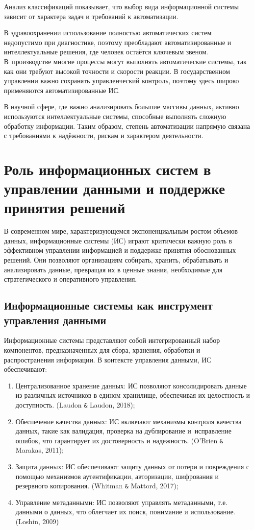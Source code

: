 \documentclass{ou}
\begin{document}
Анализ классификаций показывает, что выбор вида информационной системы зависит от характера задач и требований к автоматизации.

В здравоохранении использование полностью автоматических систем недопустимо при диагностике, поэтому преобладают автоматизированные и интеллектуальные решения, где человек остаётся ключевым звеном. В~производстве многие процессы могут выполнять автоматические системы, так как они требуют высокой точности и скорости реакции. В государственном управлении важно сохранять управленческий контроль, поэтому здесь широко применяются автоматизированные ИС.

В научной сфере, где важно анализировать большие массивы данных, активно используются интеллектуальные системы, способные выполнять сложную обработку информации. Таким образом, степень автоматизации напрямую связана с требованиями к надёжности, рискам и характером деятельности.
\newpage
\section{Роль информационных систем в управлении данными и поддержке принятия решений}
В современном мире, характеризующемся экспоненциальным ростом объемов данных, информационные системы (ИС) играют критически важную роль в эффективном управлении информацией и поддержке принятия обоснованных решений. Они позволяют организациям собирать, хранить, обрабатывать и анализировать данные, превращая их в ценные знания, необходимые для стратегического и оперативного управления.
\subsection{Информационные системы как инструмент управления данными}
Информационные системы представляют собой интегрированный набор компонентов, предназначенных для сбора, хранения, обработки и распространения информации. В контексте управления данными, ИС обеспечивают:
\begin{enumerate}[leftmargin=0em, itemindent=3.75em, nosep, label=\arabic*)]
\item Централизованное хранение данных: ИС позволяют консолидировать данные из различных источников в едином хранилище, обеспечивая их целостность и доступность. (Laudon \verb|&| Laudon, 2018);
\item Обеспечение качества данных: ИС включают механизмы контроля качества данных, такие как валидация, проверка на дублирование и~исправление ошибок, что гарантирует их достоверность и надежность. (O'Brien \verb|&| Marakas, 2011);
\item Защита данных: ИС обеспечивают защиту данных от потери и повреждения с помощью механизмов аутентификации, авторизации, шифрования и резервного копирования. (Whitman \verb|&| Mattord, 2017);
\item Управление метаданными: ИС позволяют управлять метаданными, т.е. данными о данных, что облегчает их поиск, понимание и использование. (Loshin, 2009)
\end{enumerate}
\end{document}

